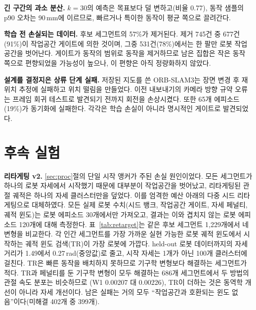\documentclass[conference,10pt]{IEEEtran}
\newcommand{\mm}{\,mm\xspace}
\begin{document}
\textbf{긴 구간의 과소 분산.} $k{=}30$의 예측은 목표보다 덜 변하고(비율 0.77), 동작 샘플의 p90 오차는 90\mm{}에 이르므로, 빠르거나
특이한 동작이 평균 쪽으로 끌려간다.

\textbf{학습 전 손실되는 데이터.} 후보 세그먼트의 57\%가 제거된다. 제거 745건 중 677건(91\%)이 작업공간 게이트에 의한 것이며, 그중
531건(78\%)에서는 한 팔만 로봇 작업공간을 벗어난다. 게이트가 동작의 범위로 동작을 제거하므로 남은 집합은 작은 동작 쪽으로 편향되었을
가능성이 높으나, 이 편향은 아직 정량화하지 않았다.

\textbf{설계를 결정지은 상류 단계 실패.} 저장된 지도를 쓴 ORB-SLAM3는 장면 변경 후 재위치 추정에 실패하고 위치 떨림을 만들었다.
이전 내보내기의 카메라 방향 규약 오류는 프레임 회귀 테스트로 발견되기 전까지 회전을 손상시켰다. 또한 65개 에피소드(19\%)가 동기화에
실패한다. 각각은 학습 손실이 아니라 명시적인 게이트로 발견되었다.

\section{후속 실험}\label{sec:follow}
\textbf{리타게팅 v2.} \ref{sec:proc}절의 단일 시작 앵커가 주된 손실 원인이었다. 모든 세그먼트가 하나의 로봇 자세에서 시작했기 때문에
대부분이 작업공간을 벗어났고, 리타게팅된 관절 궤적은 하나의 자세 클러스터만을 덮었다. 이를 엄격한 예산 아래의 다중 시드 리타게팅으로
대체하였다. 모든 실제 로봇 수치(시드 뱅크, 작업공간 게이트, 자세 페널티, 궤적 윈도)는 로봇 에피소드 30개에서만 가져오고, 결과는 이와
겹치지 않는 로봇 에피소드 120개에 대해 측정한다. 표~\ref{tab:retarget}는 같은 후보 세그먼트 1{,}229개에서 네 변형을 비교한다. 각 인간
세그먼트를 가장 가까운 실현 가능한 로봇 궤적 윈도에서 시작하는 궤적 윈도 검색(TR)이 가장 로봇에 가깝다. held-out 로봇 데이터까지의 자세
거리가 1.49에서 0.27\,rad(중앙값)로 줄고, 시작 자세는 1개가 아닌 100개 클러스터에 걸친다. TR은 빠른 동작을 배치하지 못하므로 기구학
변형보다 해결하는 세그먼트가 적다. TR과 페널티를 둔 기구학 변형이 모두 해결하는 686개 세그먼트에서 두 방법의 관절 속도 분포는 비슷하므로
(W1 0.00207 대 0.00226), TR이 더하는 것은 동역학 개선이 아니라 자세 개선이다. 남은 실패는 거의 모두 ``작업공간과 호환되는 윈도
없음''이다(미해결 402개 중 399개).

\begin{table}[t]
\centering\footnotesize\setlength{\tabcolsep}{3.5pt}
\caption{259개 에피소드의 후보 세그먼트 1{,}229개에 대한 리타게팅 변형 비교, held-out 로봇 에피소드 120개 기준.
NN: 로봇 자세까지의 최근접 이웃 관절 공간 거리(rad, p50/p90). W1: 스텝당 $|\Delta q|$의 Wasserstein 거리.}
\label{tab:retarget}
\end{table}
\end{document}
